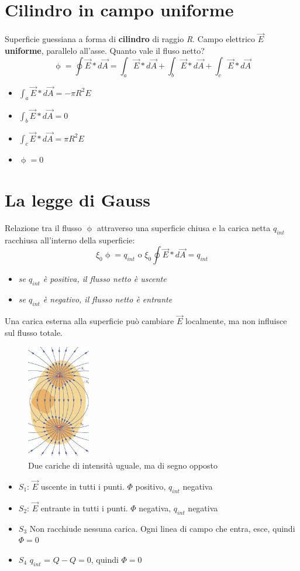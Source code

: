 \section{Cilindro in campo uniforme}
Superficie guessiana a forma di \textbf{cilindro} di raggio \textit{R}. Campo elettrico $\vec{E}$
\textbf{uniforme}, parallelo all'asse. Quanto vale il fluso netto?
\begin{equation}
  \upphi=\oint \vec{E}*d\vec{A}=\int_a \vec{E}*d\vec{A}+\int_b\vec{E}*d\vec{A}+\int_c \vec{E}*
  d\vec{A}
\end{equation}
\begin{itemize}
\item $\int_a \vec{E}*d\vec{A}=-\pi R^2E$
\item $\int_b \vec{E}*d\vec{A}=0$
\item $\int_c\vec{E}*d\vec{A}=\pi R^2E$
\item $\upphi =0$  
\end{itemize}
\section{La legge di Gauss}
Relazione tra il flusso $\upphi$ attraverso una superficie chiusa e la carica netta $q_{int}$ racchiusa all'interno della superficie:
\begin{equation}
	\xi_0\upphi=q_{int} \text{ o } \xi_0\oint \vec{E}*d\vec{A}=q_{int}
\end{equation}
\begin{itemize}
\item \textit{se $q_{int}$ è positiva, il flusso netto è uscente}
\item \textit{se $q_{int}$ è negativo, il flusso netto è entrante}
\end{itemize}
Una carica esterna alla superficie può cambiare $\vec{E}$ localmente, ma non influisce sul flusso totale.
\begin{figure}[!h]
 	\centering
	\includegraphics[height=5cm]{img/cariche opposte.jpg}
    	\caption{Due cariche di intensità uguale, ma di segno opposto}
\end{figure}
\begin{itemize}
\item $S_1$: $\vec{E}$ uscente in tutti i punti. $\Phi$ positivo, $q_{int}$ negativa
\item $S_2$: $\vec{E}$ entrante in tutti i punti. $\Phi$ negativa, $q_{int}$ negativa
\item $S_3$ Non racchiude nessuna carica. Ogni linea di campo che entra, esce, quindi $\Phi = 0$
  \item $S_4$ $q_{int}$ = $Q-Q=0$, quindi $\Phi = 0$
\end{itemize}


